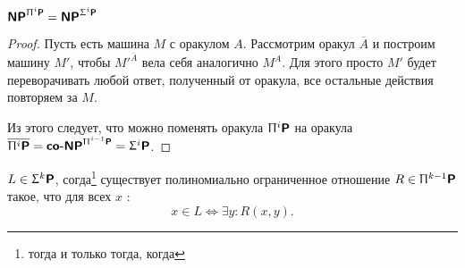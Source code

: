 \begin{lm}
    $ \textmd{\textbf{\textsf{NP}}}^{\Uppi^{i}\textmd{\textbf{\textsf{P}}}} = \textmd{\textbf{\textsf{NP}}}^{\Upsigma^{i}\textmd{\textbf{\textsf{P}}}}$
\end{lm}
\begin{proof}
    Пусть есть машина $ M$ с оракулом $ A$. Рассмотрим оракул $ \overline{A}$ и построим машину $ M'$, чтобы $ M'^{\overline{A}}$ вела себя аналогично $ M^{A}$. Для этого просто $ M'$ будет переворачивать любой ответ, полученный от оракула, все остальные действия повторяем за $ M$.

	Из этого следует, что можно поменять оракула $ \Uppi^{i}\textmd{\textbf{\textsf{P}}}$ на оракула $ \overline{\Uppi^{i}\textmd{\textbf{\textsf{P}}}} = \textmd{\textbf{\textsf{co-NP}}}^{\Uppi^{i-1}\textmd{\textbf{\textsf{P}}}} = \Upsigma^{i}\textmd{\textbf{\textsf{P}}}$.
\end{proof}

\begin{thm}
    $ L \in \Upsigma^{k}\textmd{\textbf{\textsf{P}}}$, согда\footnote{тогда и только тогда, когда} существует полиномиально ограниченное отношение $ R \in \Uppi^{k-1}\textmd{\textbf{\textsf{P}}}$ такое, что для всех $ x$ :
	\[
		x \in L \Longleftrightarrow \exists y \colon R(x, y)
	.\] 
\end{thm}
